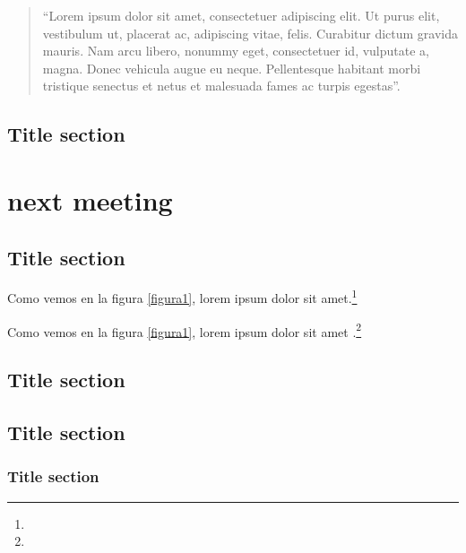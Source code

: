 \documentclass{book}
\begin{document}
\begin{quote}
	\enquote{Lorem ipsum dolor sit amet, consectetuer adipiscing elit. Ut purus elit, vestibulum ut, placerat ac, adipiscing vitae, felis. Curabitur dictum gravida mauris. Nam arcu libero, nonummy eget, consectetuer id, vulputate a, magna. Donec vehicula augue eu neque. Pellentesque habitant morbi tristique senectus et netus et malesuada fames ac turpis egestas}.
\end{quote}

\lipsum[5]

\section{Title section}

\lipsum[1]

\chapter{next meeting}
\label{mychapter2}

\section{Title section}

\lipsum[1]

\lipsum[1]

Como vemos en la figura \ref{figura1}, lorem ipsum dolor sit amet.\footnote{\lipsum[1]}

\lipsum[1]

\lipsum[1]

Como vemos en la figura \ref{figura1}, lorem ipsum dolor sit amet \parencite{@3159-FUNES2006}.\footnote{\lipsum[1]}

\lipsum[1]

\lipsum[2]

\section{Title section}

\lipsum[3]

\section{Title section}

\lipsum[1]

\subsection{Title section}
\end{document}

